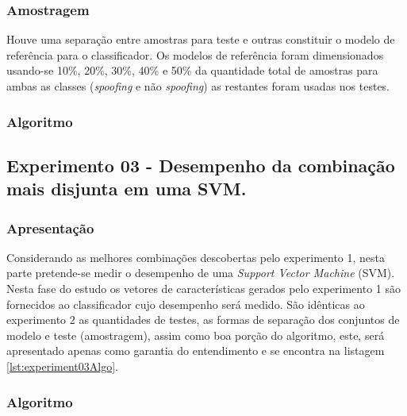 \begin{myenv}{1.5}
				\subsubsection{Amostragem}
					\par Houve uma separação entre amostras para teste e outras constituir o modelo de referência para o classificador. Os modelos de referência foram dimensionados usando-se 10\%, 20\%, 30\%, 40\% e 50\% da quantidade total de amostras para ambas as classes (\textit{spoofing} e não \textit{spoofing}) as restantes foram usadas nos testes.	
				\subsubsection{Algoritmo}
				

			\subsection{Experimento 03 - Desempenho da combinação mais disjunta em uma SVM.}
				\subsubsection{Apresentação}
					\par Considerando as melhores combinações descobertas pelo experimento 1, nesta parte pretende-se medir o desempenho de uma \textit{Support Vector Machine} (SVM). Nesta fase do estudo os vetores de características gerados pelo experimento 1 são fornecidos ao classificador cujo desempenho será medido. São idênticas ao experimento 2 as quantidades de testes, as formas de separação dos conjuntos de modelo e teste (amostragem), assim como boa porção do algoritmo, este, será apresentado apenas como garantia do entendimento e se encontra na listagem \ref{lst:experiment03Algo}.

				\subsubsection{Algoritmo}
				
	\end{myenv}